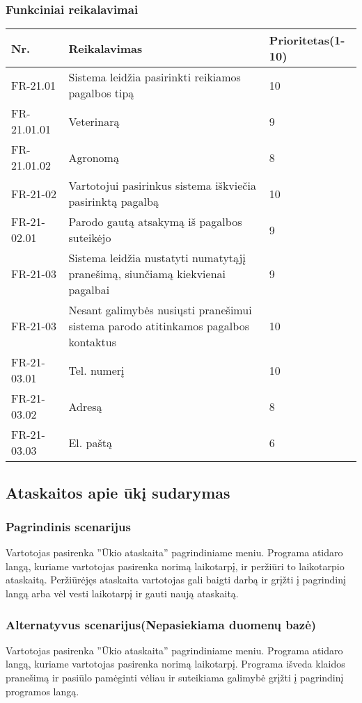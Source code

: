 \documentclass[oneside]{VUMIFPSkursinis}
\begin{document}
	\subsubsection{Funkciniai reikalavimai}
	\begin{table}[htbp]
		\begin{tabularx}{1\textwidth}{ |P{2.5cm}|X|P{3cm }| }  \hline
			Nr. & Reikalavimas & Prioritetas(1-10) \\ \hline
			FR-21.01 & Sistema leidžia pasirinkti reikiamos pagalbos tipą & 10 \\ \hline
			FR-21.01.01 & Veterinarą & 9 \\ \hline
			FR-21.01.02 & Agronomą & 8 \\ \hline
			FR-21-02 & Vartotojui pasirinkus sistema iškviečia pasirinktą pagalbą & 10 \\ \hline	
			FR-21-02.01 & Parodo gautą atsakymą iš pagalbos suteikėjo & 9 \\ \hline
			FR-21-03 & Sistema leidžia nustatyti numatytąjį pranešimą, siunčiamą kiekvienai pagalbai & 9 \\ \hline	
			FR-21-03 & Nesant galimybės nusiųsti pranešimui sistema parodo atitinkamos pagalbos kontaktus & 10 \\ \hline	
			FR-21-03.01 & Tel. numerį & 10 \\ \hline	
			FR-21-03.02 & Adresą & 8 \\ \hline	
			FR-21-03.03 & El. paštą & 6 \\ \hline						
		\end{tabularx}
	\end{table}
\subsection{Ataskaitos apie ūkį sudarymas}
	\subsubsection{Pagrindinis scenarijus}
	Vartotojas pasirenka ''Ūkio ataskaita'' pagrindiniame meniu. Programa atidaro langą, kuriame vartotojas pasirenka norimą laikotarpį, ir peržiūri to laikotarpio ataskaitą. Peržiūrėjęs ataskaita vartotojas gali baigti darbą ir grįžti į pagrindinį langą arba vėl vesti laikotarpį ir gauti naują ataskaitą.
	\subsubsection{Alternatyvus scenarijus(Nepasiekiama duomenų bazė)}
	Vartotojas pasirenka ''Ūkio ataskaita'' pagrindiniame meniu. Programa atidaro langą, kuriame vartotojas pasirenka norimą laikotarpį. Programa išveda klaidos pranešimą ir pasiūlo pamėginti vėliau ir suteikiama galimybė grįžti į pagrindinį programos langą.
\end{document}
